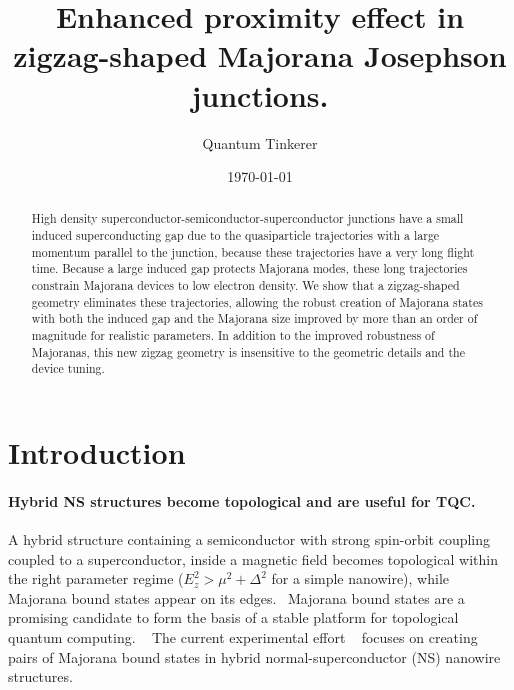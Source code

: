 \documentclass[english, twocolumn, 10pt, aps, superscriptaddress, floatfix, prb, citeautoscript]{revtex4-1}
\renewcommand{\comment}[2]{#2}
\renewcommand{\comment}{\paragraph}
\begin{document}
\title{Enhanced proximity effect in zigzag-shaped Majorana Josephson junctions.}

\author{Quantum Tinkerer}

\date{\today}
\begin{abstract}
High density superconductor-semiconductor-superconductor junctions have a small induced superconducting gap due to the quasiparticle trajectories with a large momentum parallel to the junction, because these trajectories have a very long flight time.
Because a large induced gap protects Majorana modes, these long trajectories constrain Majorana devices to low electron density.
We show that a zigzag-shaped geometry eliminates these trajectories, allowing the robust creation of Majorana states with both the induced gap and the Majorana size improved by more than an order of magnitude for realistic parameters.
In addition to the improved robustness of Majoranas, this new zigzag geometry is insensitive to the geometric details and the device tuning.
\end{abstract}

\maketitle

\section{Introduction}
\comment{Hybrid NS structures become topological and are useful for TQC.}
A hybrid structure containing a semiconductor with strong spin-orbit coupling coupled to a superconductor, inside a magnetic field becomes topological within the right parameter regime ($E_z^2>\mu^2+\Delta^2$ for a simple nanowire), while Majorana bound states appear on its edges.~\cite{lutchyn_majorana_2010,oreg_helical_2010}
Majorana bound states are a promising candidate to form the basis of a stable platform for topological quantum computing. ~\cite{alicea2012new,beenakker2013search}
The current experimental effort ~\cite{mourik_signatures_2012,das_zero-bias_2012,deng_anomalous_2012,churchill_superconductor-nanowire_2013,zhang2018quantized} focuses on creating pairs of Majorana bound states in hybrid normal-superconductor (NS) nanowire structures.
\end{document}
